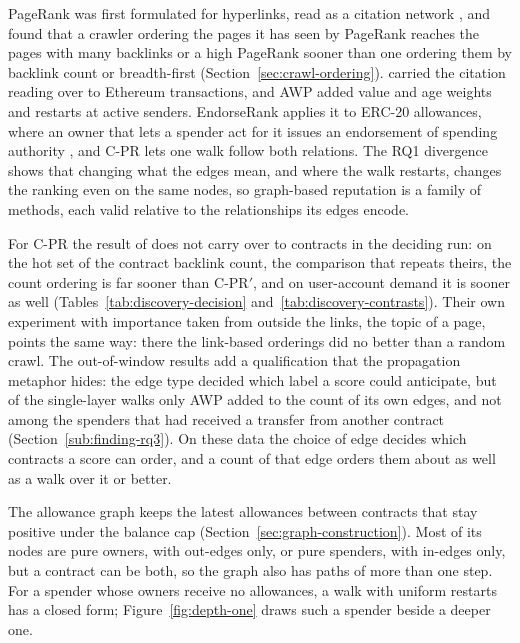 

PageRank was first formulated for hyperlinks, read as a citation network \parencite{page1999pagerank}, and \textcite{cho1998crawling} found that a crawler ordering the pages it has seen by PageRank reaches the pages with many backlinks or a high PageRank sooner than one ordering them by backlink count or breadth-first (Section~\ref{sec:crawl-ordering}). \textcite{do2023hodgerank} carried the citation reading over to Ethereum transactions, and AWP \parencite{do2023awp} added value and age weights and restarts at active senders. EndorseRank applies it to ERC-20 allowances, where an owner that lets a spender act for it issues an endorsement of spending authority \parencite{vogelsteller2015erc20}, and \mbox{C-PR} lets one walk follow both relations. The RQ1 divergence shows that changing what the edges mean, and where the walk restarts, changes the ranking even on the same nodes, so graph-based reputation is a family of methods, each valid relative to the relationships its edges encode.

For \mbox{C-PR} the result of \textcite{cho1998crawling} does not carry over to contracts in the deciding run: on the hot set of the contract backlink count, the comparison that repeats theirs, the count ordering is far sooner than \mbox{C-PR}$'$, and on user-account demand it is sooner as well (Tables~\ref{tab:discovery-decision} and~\ref{tab:discovery-contrasts}). Their own experiment with importance taken from outside the links, the topic of a page, points the same way: there the link-based orderings did no better than a random crawl. The out-of-window results add a qualification that the propagation metaphor hides: the edge type decided which label a score could anticipate, but of the single-layer walks only AWP added to the count of its own edges, and not among the spenders that had received a transfer from another contract (Section~\ref{sub:finding-rq3}). On these data the choice of edge decides which contracts a score can order, and a count of that edge orders them about as well as a walk over it or better.


The allowance graph keeps the latest allowances between contracts that stay positive under the balance cap (Section~\ref{sec:graph-construction}). Most of its nodes are pure owners, with out-edges only, or pure spenders, with in-edges only, but a contract can be both, so the graph also has paths of more than one step. For a spender whose owners receive no allowances, a walk with uniform restarts has a closed form; Figure~\ref{fig:depth-one} draws such a spender beside a deeper one.


